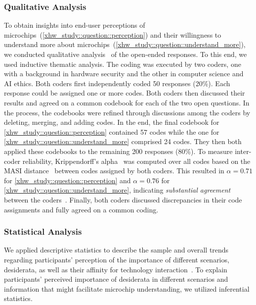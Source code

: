 \subsubsection{Qualitative Analysis}
To obtain insights into end-user perceptions of microchips~(\autoref{xhw_study::question::perception}) and their willingness to understand more about microchips~(\autoref{xhw_study::question::understand_more}), we conducted qualitative analysis~\cite{mayring_qualitative_2014} of the open-ended responses.
To this end, we used inductive thematic analysis.
The coding was executed by two coders, one with a background in hardware security and the other in computer science and \acs{AI} ethics.
Both coders first independently coded 50 responses (20\%). 
Each response could be assigned one or more codes.
Both coders then discussed their results and agreed on a common codebook for each of the two open questions.
In the process, the codebooks were refined through discussions among the coders by deleting, merging, and adding codes.
In the end, the final codebook for \autoref{xhw_study::question::perception} contained 57 codes while the one for \autoref{xhw_study::question::understand_more} comprised 24 codes.
They then both applied these codebooks to the remaining 200 responses (80\%).
To measure inter-coder reliability, Krippendorff's alpha~\cite{krippendorff2018content} was computed over all codes based on the MASI distance~\cite{passonneau2006measuring} between codes assigned by both coders.
This resulted in $\alpha$$=$$0.71$ for \autoref{xhw_study::question::perception} and $\alpha$$=$$0.76$ for \autoref{xhw_study::question::understand_more}, indicating \textit{substantial agreement} between the coders~\cite{landis1977measurement}.
Finally, both coders discussed discrepancies in their code assignments and fully agreed on a common coding.

\subsubsection{Statistical Analysis}
We applied descriptive statistics to describe the sample and overall trends regarding participants' perception of the importance of different scenarios, desiderata, as well as their affinity for technology interaction~\cite{franke2019personal}.
To explain participants' perceived importance of desiderata in different scenarios and information that might facilitate microchip understanding, we utilized inferential statistics.

